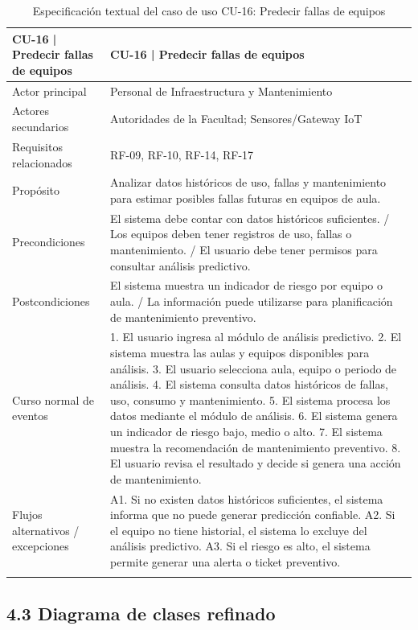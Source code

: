 \begingroup
\small
\begin{longtable}{|P{0.5000}|P{0.5000}|}
\hline
CU-16 | Predecir fallas de equipos & CU-16 | Predecir fallas de equipos \\ \hline
Actor principal & Personal de Infraestructura y Mantenimiento \\ \hline
Actores secundarios & Autoridades de la Facultad; Sensores/Gateway IoT \\ \hline
Requisitos relacionados & RF-09, RF-10, RF-14, RF-17 \\ \hline
Propósito & Analizar datos históricos de uso, fallas y mantenimiento para estimar posibles fallas futuras en equipos de aula. \\ \hline
Precondiciones & El sistema debe contar con datos históricos suficientes. / Los equipos deben tener registros de uso, fallas o mantenimiento. / El usuario debe tener permisos para consultar análisis predictivo. \\ \hline
Postcondiciones & El sistema muestra un indicador de riesgo por equipo o aula. / La información puede utilizarse para planificación de mantenimiento preventivo. \\ \hline
Curso normal de eventos & 1. El usuario ingresa al módulo de análisis predictivo. 2. El sistema muestra las aulas y equipos disponibles para análisis. 3. El usuario selecciona aula, equipo o periodo de análisis. 4. El sistema consulta datos históricos de fallas, uso, consumo y mantenimiento. 5. El sistema procesa los datos mediante el módulo de análisis. 6. El sistema genera un indicador de riesgo bajo, medio o alto. 7. El sistema muestra la recomendación de mantenimiento preventivo. 8. El usuario revisa el resultado y decide si genera una acción de mantenimiento. \\ \hline
Flujos alternativos / excepciones & A1. Si no existen datos históricos suficientes, el sistema informa que no puede generar predicción confiable. A2. Si el equipo no tiene historial, el sistema lo excluye del análisis predictivo. A3. Si el riesgo es alto, el sistema permite generar una alerta o ticket preventivo. \\ \hline
\caption{Especificación textual del caso de uso CU-16: Predecir fallas de equipos}
\end{longtable}
\endgroup

\subsection*{4.3 Diagrama de clases refinado}

